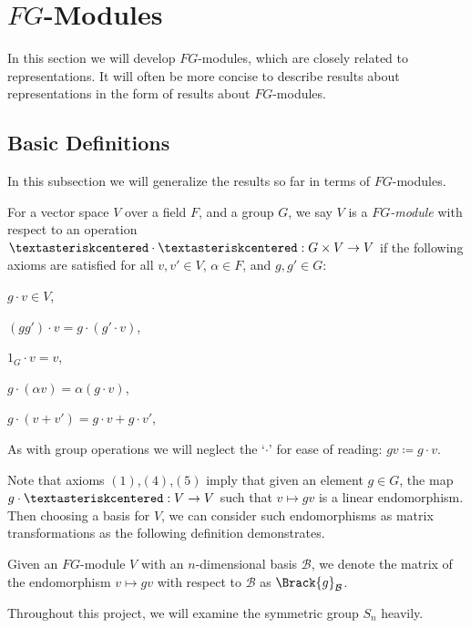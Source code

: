 \documentclass[../Project.tex]{subfiles}
\begin{document}
\newpage
\section{$FG$-Modules}
In this section we will develop $FG$-modules, which are closely related to representations. It will often be more concise to describe results about representations in the form of results about $FG$-modules.

\subsection{Basic Definitions}
In this subsection we will generalize the results so far in terms of $FG$-modules.
\begin{defi}
	For a vector space $V$ over a field $F$, and a group $G$, we say $V$ is a \textit{$FG$-module} with respect to an operation $\textasteriskcentered \cdot \textasteriskcentered : G \times V \to V$ if the following axioms are satisfied for all $v,v' \in V$, $\alpha \in F$, and $g,g' \in G$:
	\begin{menum}
		\item $g \cdot v \in V$,
		\item $(gg') \cdot v = g \cdot (g' \cdot v)$,
		\item $1_G \cdot v = v$,
		\item $g \cdot (\alpha v) = \alpha(g \cdot v)$,
		\item $g \cdot (v + v') = g\cdot v + g \cdot v'$,
	\end{menum}
	As with group operations we will neglect the `$\cdot$' for ease of reading: $gv \coloneqq g \cdot v$.
\end{defi}

Note that axioms $(1)$,$(4)$,$(5)$ imply that given an element $g \in G$, the map $g \cdot \textasteriskcentered : V \to V$ such that $v \mapsto gv$ is a linear endomorphism. Then choosing a basis for $V$, we can consider such endomorphisms as matrix transformations as the following definition demonstrates.

\begin{defi}
	Given an $FG$-module $V$ with an $n$-dimensional basis $\mathcal{B}$, we denote the matrix of the endomorphism $v \mapsto gv$ with respect to $\mathcal{B}$ as $\Brack{g}_\mathcal{B}$.\\
\end{defi}

Throughout this project, we will examine the symmetric group $S_n$ heavily. 
\end{document}
